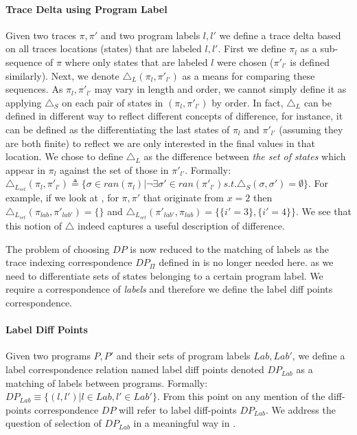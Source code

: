 \paragraph{Trace Delta using Program Label}
Given two traces $\pi,\pi'$ and two program labels $l,l'$ we define a trace delta based on all traces locations (states) that are labeled $l,l'$. First we define $\pi_{l}$ as a sub-sequence of $\pi$ where only states that are labeled $l$ were chosen ($\pi'_{l'}$ is defined similarly). Next, we denote $\triangle_L(\pi_{l},\pi'_{l'})$ as a means for comparing these sequences. As $\pi_{l},\pi'_{l'}$ may vary in length and order, we cannot simply define it as applying $\triangle_{S}$ on each pair of states in $(\pi_{l},\pi'_{l'})$ by order. In fact, $\triangle_{L}$ can be defined in different way to reflect different concepts of difference, for instance, it can be defined as the differentiating the last states of $\pi_{l}$ and $\pi'_{l'}$ (assuming they are both finite) to reflect we are only interested in the final values in that location. We chose to define $\triangle_{L}$ as the difference between \emph{the set of states} which appear in $\pi_{l}$ against the set of those in $\pi'_{l'}$. Formally: $\triangle_{L_{set}}(\pi_{l},\pi'_{l'}) \triangleq \{ \sigma \in ran(\pi_{l}) | \neg \exists \sigma' \in ran(\pi'_{l'}) s.t. \triangle_{S}(\sigma,\sigma') = \emptyset \}$. For example, if we look at , for $\pi, \pi'$ that originate from $x=2$  then $\triangle_{L_{set}}(\pi_{lab},\pi'_{lab'}) = \{\}$ and $\triangle_{L_{set}}(\pi'_{lab'},\pi_{lab}) = \{\{ i'=3 \},\{i'=4\}\}$. We see that this notion of $\triangle$ indeed captures a useful description of difference.

The problem of choosing $DP$ is now reduced to the matching of labels as the trace indexing correspondence $DP_{\Pi}$ defined in  is no longer needed here. as we need to differentiate sets of states belonging to a certain program label. We require a correspondence of \emph{labels} and therefore we define the label diff points correspondence.

\paragraph{Label Diff Points} 
Given two programs $P,P'$ and their sets of program labels $Lab,Lab'$, we define a label correspondence relation named label diff points denoted $DP_{Lab}$ as a matching of labels between programs. Formally: $DP_{Lab} \equiv \{(l,l')|l \in Lab, l' \in Lab'\}$. From this point on any mention of the diff-points correspondence $DP$ will refer to label diff-points $DP_{Lab}$. We address the question of selection of $DP_{Lab}$ in a meaningful way in . %

